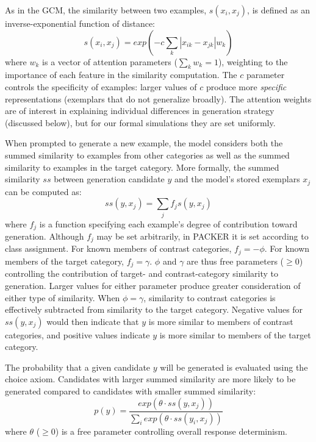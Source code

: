 \documentclass[10pt,letterpaper]{article}
\begin{document}
As in the GCM, the similarity between two examples, $s(x_i, x_j)$, is defined as an inverse-exponential function of distance:
\begin{equation}
  s(x_i,x_j) = exp( -c \sum_{k}{|x_{ik} - x_{jk}|}w_k ) 
\end{equation}
where $w_k$ is a vector of attention parameters ($\sum_k{w_k} = 1$), weighting to the importance of each feature in the similarity computation. The $c$ parameter controls the specificity of examples: larger values of $c$ produce more \textit{specific} representations (exemplars that do not generalize broadly). The attention weights are of interest in explaining individual differences in generation strategy (discussed below), but for our formal simulations they are set uniformly.

When prompted to generate a new example, the model considers both the summed similarity to examples from other categories as well as the summed similarity to examples in the target category. More formally, the summed similarity $ss$ between generation candidate $y$ and the model's stored exemplars $x_j$ can be computed as:
\begin{equation}
  ss(y, x_j) = \sum_j{f_j s(y, x_j)}
\end{equation}
where $f_j$ is a function specifying each example's degree of contribution toward generation. Although $f_j$ may be set arbitrarily, in PACKER it is set according to class assignment. For known members of contrast categories, $f_j = -\phi$. For known members of the target category, $f_j = \gamma$. $\phi$ and $\gamma$ are thus free parameters ($\geq 0$) controlling the contribution of target- and contrast-category similarity to generation. Larger values for either parameter produce greater consideration of either type of similarity. When $\phi = \gamma$, similarity to contrast categories is effectively subtracted from similarity to the target category. Negative values for $ss(y, x_j)$ would then indicate that $y$ is more similar to members of contrast categories, and positive values indicate $y$ is more similar to members of the target category.


The probability that a given candidate $y$ will be generated is evaluated using the \citet{luce1977choice} choice axiom. Candidates with larger summed similarity are more likely to be generated compared to candidates with smaller summed similarity:
\begin{equation}
p(y) = \dfrac
    { exp( { \theta \cdot ss(y, x_j) } ) }
    { \sum_i{ exp( { \theta \cdot ss(y_i, x_j) } ) } }
\end{equation}
where $\theta$ ($\geq 0$) is a free parameter controlling overall response determinism. 
\end{document}
